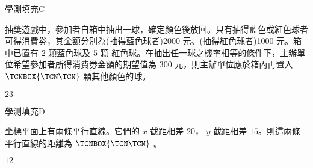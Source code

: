     \begin{QUESTION}
        \begin{ExamInfo}{98}{學測}{填充}{C}
        \end{ExamInfo}
        \begin{ExamAnsRateInfo}{60}{92}{69}{19}
        \end{ExamAnsRateInfo}
        \begin{QBODY}
            抽獎遊戲中，參加者自箱中抽出一球，確定顏色後放回。只有抽得藍色或紅色球者可得消費劵，其金額分別為(抽得藍色球者)2000 元、(抽得紅色球者)1000 元。箱中已置有 2 顆藍色球及 5 顆 紅色球。在抽出任一球之機率相等的條件下，主辦單位希望參加者所得消費劵金額的期望值為 300 元，則主辦單位應於箱內再置入 $\TCNBOX{\TCN\TCN}$ 顆其他顏色的球。
        \end{QBODY}
        \begin{QFROMS}
        \end{QFROMS}
        \begin{QTAGS}\end{QTAGS}
        \begin{QANS}
            $23$
        \end{QANS}
        \begin{QSOLLIST}
        \end{QSOLLIST}
        \begin{QEMPTYSPACE}
        \end{QEMPTYSPACE}
    \end{QUESTION}
    \begin{QUESTION}
        \begin{ExamInfo}{98}{學測}{填充}{D}
        \end{ExamInfo}
        \begin{ExamAnsRateInfo}{39}{79}{32}{6}
        \end{ExamAnsRateInfo}
        \begin{QBODY}
            坐標平面上有兩條平行直線。它們的 $x$ 截距相差 $20$， $y$ 截距相差 $15$。則這兩條平行直線的距離為 $\TCNBOX{\TCN\TCN}$ 。
        \end{QBODY}
        \begin{QFROMS}
        \end{QFROMS}
        \begin{QTAGS}\end{QTAGS}
        \begin{QANS}
            $12$
        \end{QANS}
        \begin{QSOLLIST}
        \end{QSOLLIST}
        \begin{QEMPTYSPACE}
        \end{QEMPTYSPACE}
    \end{QUESTION}
